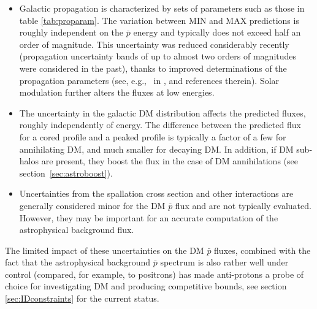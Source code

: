 \begin{itemize}
\item[$\triangleright$] Galactic propagation is characterized by sets of parameters such as those in table \ref{tab:proparam}. The variation between MIN and MAX predictions is roughly independent on the $\bar p$ energy and typically does not exceed half an order of magnitude. This uncertainty was reduced considerably recently (propagation uncertainty bands of up to almost two orders of magnitudes were considered in the past), thanks to improved  determinations of the propagation parameters (see, e.g.,~ in \cite{CRpropagation}, and references therein).
Solar modulation further alters  the fluxes at low energies.
\item[$\triangleright$] The uncertainty in the galactic DM distribution affects the predicted fluxes, roughly independently of energy. 
The difference between the predicted flux for a cored profile and a peaked profile is typically a factor of a few for annihilating DM, and much smaller for decaying DM. 
In addition, if DM sub-halos are present, they boost the flux in the case of DM annihilations (see section~\ref{sec:astroboost}).
\item[$\triangleright$] Uncertainties from the spallation cross section and other interactions 
are generally considered minor for the DM $\bar p$ flux and are not typically evaluated. 
However, they may be important for 
an accurate computation of the astrophysical background flux.
\end{itemize}
The limited impact of these uncertainties on the DM $\bar p$ fluxes, combined with the fact that the astrophysical background $\bar p$ spectrum is also rather well under control 
(compared, for example, to positrons) has made anti-protons a probe of choice for investigating DM and producing competitive bounds, see section \ref{sec:IDconstraints} for the current status.


